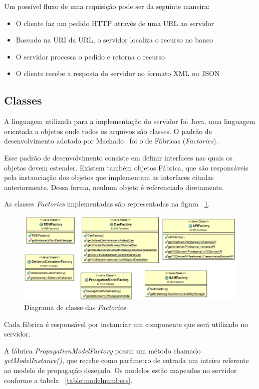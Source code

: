 Um possível fluxo de uma requisição pode ser da seguinte maneira:

\begin{itemize}
\item O cliente faz um pedido HTTP através de uma URL ao servidor
\item Baseado na URI da URL, o servidor localiza o recurso no banco
\item O servidor processa o pedido e retorna o recurso
\item O cliente recebe a resposta do servidor no formato XML ou JSON
\end{itemize}


\subsection{Classes}
A linguagem utilizada para a implementação do servidor foi Java, uma linguagem orientada a objetos onde todos os arquivos são classes. O padrão de desenvolvimento adotado por Machado~\cite{tccmarcelo} foi o de Fábricas (\textit{Factories}).

Esse padrão de desenvolvimento consiste em definir interfaces nas quais os objetos devem estender. Existem também objetos Fábrica, que são responsáveis pela instanciação dos objetos que implementam as interfaces citadas anteriormente. Dessa forma, nenhum objeto é referenciado diretamente.

As classes \textit{Factories} implementadas são representadas na figura ~\ref{fig:facto}.

\begin{figure}[htb]
\centering
\includegraphics[width=1.0\textwidth]{figs/factories}
\caption[\textit{Factories}.]
{Diagrama de classe das \textit{Factories}~\cite{tccmarcelo} }
\label{fig:facto}
\end{figure} 


Cada fábrica é responsável por instanciar um componente que será utilizado no servidor. 

A fábrica \textit{PropagationModelFactory} possui um método chamado \textit{getModelInstance()}, que recebe como parâmetro de entrada um inteiro referente ao modelo de propagação desejado. Os modelos estão mapeados no servidor conforme a tabela ~\ref{table:modelnumbers}.


